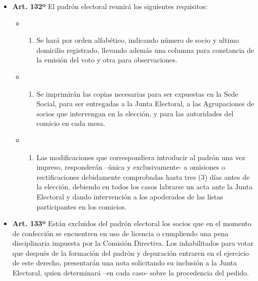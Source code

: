 \documentclass[]{book}
\providecommand{\tightlist}{%
  \setlength{\itemsep}{0pt}\setlength{\parskip}{0pt}}
\begin{document}
\begin{itemize}
\tightlist
\item
  \textbf{Art. 132º} El padrón electoral reunirá los siguientes
  requisitos:

  \begin{itemize}
  \item
    \begin{enumerate}
    \def\labelenumi{\alph{enumi})}
    \tightlist
    \item
      Se hará por orden alfabético, indicando número de socio y ultimo
      domicilio registrado, llevando además una columna para constancia
      de la emisión del voto y otra para observaciones.
    \end{enumerate}
  \item
    \begin{enumerate}
    \def\labelenumi{\alph{enumi})}
    \setcounter{enumi}{1}
    \tightlist
    \item
      Se imprimirán las copias necesarias para ser expuestas en la Sede
      Social, para ser entregadas a la Junta Electoral, a las
      Agrupaciones de socios que intervengan en la elección, y para las
      autoridades del comicio en cada mesa.
    \end{enumerate}
  \item
    \begin{enumerate}
    \def\labelenumi{\alph{enumi})}
    \setcounter{enumi}{2}
    \tightlist
    \item
      Las modificaciones que correspondiera introducir al padrón una vez
      impreso, responderán --única y exclusivamente- a omisiones o
      rectificaciones debidamente comprobadas hasta tres (3) días antes
      de la elección, debiendo en todos los casos labrarse un acta ante
      la Junta Electoral y dando intervención a los apoderados de las
      listas participantes en los comicios.
    \end{enumerate}
  \end{itemize}
\end{itemize}

\begin{itemize}
\tightlist
\item
  \textbf{Art. 133º} Están excluidos del padrón electoral los socios que
  en el momento de confección se encuentren en uso de licencia o
  cumpliendo una pena disciplinaria impuesta por la Comisión Directiva.
  Los inhabilitados para votar que después de la formación del padrón y
  depuración entraren en el ejercicio de este derecho, presentarán una
  nota solicitando su inclusión a la Junta Electoral, quien determinará
  --en cada caso- sobre la procedencia del pedido.
\end{itemize}
\end{document}
